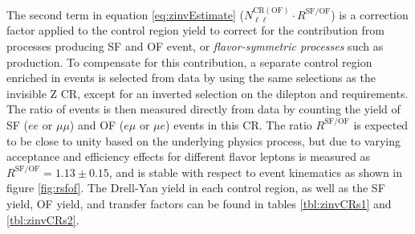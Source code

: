 The second term in equation \ref{eq:zinvEstimate} ($N_{\ell\ell}^{\mathrm{CR(OF)}}\cdot R^{\mathrm{SF/OF}}$) is a correction factor applied to the control region yield to correct for the contribution from processes producing SF and OF event, or {\it flavor-symmetric processes} such as \ttbar production. To compensate for this contribution, a separate control region enriched in \ttbar events is selected from data by using the same selections as the invisible Z CR, except for an inverted selection on the dilepton \pt and \mll requirements. The ratio of \ttbar events is then measured directly from data by counting the yield of SF ($ee$ or $\mu\mu$) and OF ($e\mu$ or $\mu e$) events in this CR. The ratio $R^{\mathrm{SF/OF}}$ is expected to be close to unity based on the underlying physics process, but due to varying acceptance and efficiency effects for different flavor leptons is measured as $R^{\mathrm{SF/OF}} = 1.13 \pm 0.15$, and is stable with respect to event kinematics as shown in figure \ref{fig:rsfof}. The Drell-Yan yield in each control region, as well as the SF yield, OF yield, and transfer factors can be found in tables \ref{tbl:zinvCRs1} and \ref{tbl:zinvCRs2}.
